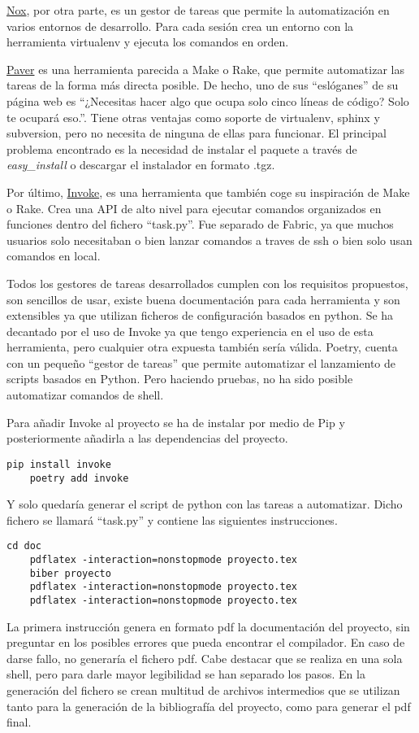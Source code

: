 \href{https://nox.thea.codes/en/stable/}{Nox}, por otra parte, es un gestor de tareas que permite la automatización en varios entornos de desarrollo. Para cada sesión crea un entorno con la herramienta virtualenv y ejecuta los comandos en orden.

\href{https://pythonhosted.org/Paver/}{Paver} es una herramienta parecida a Make o Rake, que permite automatizar las tareas de la forma más directa posible. De hecho, uno de sus ``eslóganes'' de su página web es ``¿Necesitas hacer algo que ocupa solo cinco líneas de código? Solo te ocupará eso.''. Tiene otras ventajas como soporte de virtualenv, sphinx y subversion, pero no necesita de ninguna de ellas para funcionar. El principal problema encontrado es la necesidad de instalar el paquete a través de \emph{easy_install} o descargar el instalador en formato \gls{.tgz}.

Por último, \href{https://www.pyinvoke.org/}{Invoke}, es una herramienta que también coge su inspiración de Make o Rake. Crea una \gls{API} de alto nivel para ejecutar comandos organizados en funciones dentro del fichero ``task.py''. Fue separado de Fabric, ya que muchos usuarios solo necesitaban o bien lanzar comandos a traves de ssh o bien solo usan comandos en local. 

Todos los gestores de tareas desarrollados cumplen con los requisitos propuestos, son sencillos de usar, existe buena documentación para cada herramienta y son extensibles ya que utilizan ficheros de configuración basados en \Gls{python}. Se ha decantado por el uso de Invoke ya que tengo experiencia en el uso de esta herramienta, pero cualquier otra expuesta también sería válida. Poetry, cuenta con un pequeño ``gestor de tareas'' que permite automatizar el lanzamiento de scripts basados en \Gls{Python}. Pero haciendo pruebas, no ha sido posible automatizar comandos de \Gls{shell}.

Para añadir Invoke al proyecto se ha de instalar por medio de Pip y posteriormente añadirla a las \glspl{dependencia} del proyecto.
\begin{lstlisting}[style=consola]
	pip install invoke
	poetry add invoke
\end{lstlisting}

Y solo quedaría generar el \gls{script} de python con las tareas a automatizar. Dicho fichero se llamará ``task.py'' y contiene las siguientes instrucciones. 

\begin{lstlisting}[style=consola]
	cd doc
	pdflatex -interaction=nonstopmode proyecto.tex
	biber proyecto
	pdflatex -interaction=nonstopmode proyecto.tex
	pdflatex -interaction=nonstopmode proyecto.tex
\end{lstlisting}
La primera instrucción genera en formato pdf la documentación del proyecto, sin preguntar en los posibles errores que pueda encontrar el compilador. En caso de darse fallo, no generaría el fichero pdf. Cabe destacar que se realiza en una sola \gls{shell}, pero para darle mayor legibilidad se han separado los pasos. En la generación del fichero se crean multitud de archivos intermedios que se utilizan tanto para la generación de la bibliografía del proyecto, como para generar el pdf final. 

